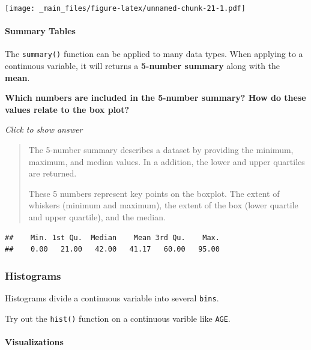 \documentclass[
]{book}
\newenvironment{Shaded}{\begin{snugshade}}{\end{snugshade}}
\newcommand{\FunctionTok}[1]{\textcolor[rgb]{0.13,0.29,0.53}{\textbf{#1}}}
\newcommand{\NormalTok}[1]{#1}
\newcommand{\SpecialCharTok}[1]{\textcolor[rgb]{0.81,0.36,0.00}{\textbf{#1}}}
\begin{document}
\texttt{[image: \_main\_files/figure-latex/unnamed-chunk-21-1.pdf]}

\hypertarget{summary-tables}{%
\paragraph{Summary Tables}\label{summary-tables}}

The \texttt{summary()} function can be applied to many data types. When applying to a continuous variable, it will returns a \textbf{5-number summary} along with the \textbf{mean}.

\textbf{Which numbers are included in the 5-number summary? How do these values relate to the box plot?}

\emph{Click to show answer}

\begin{quote}
The 5-number summary describes a dataset by providing the minimum, maximum, and median values. In a addition, the lower and upper quartiles are returned.

These 5 numbers represent key points on the boxplot. The extent of whiskers (minimum and maximum), the extent of the box (lower quartile and upper quartile), and the median.
\end{quote}

\begin{Shaded}
\end{Shaded}

\begin{verbatim}
##    Min. 1st Qu.  Median    Mean 3rd Qu.    Max. 
##    0.00   21.00   42.00   41.17   60.00   95.00
\end{verbatim}

\hypertarget{histograms}{%
\subsubsection{Histograms}\label{histograms}}

Histograms divide a continuous variable into several \texttt{bins}.

Try out the \texttt{hist()} function on a continuous varible like \texttt{AGE}.

\hypertarget{visualizations-1}{%
\paragraph{Visualizations}\label{visualizations-1}}
\end{document}
